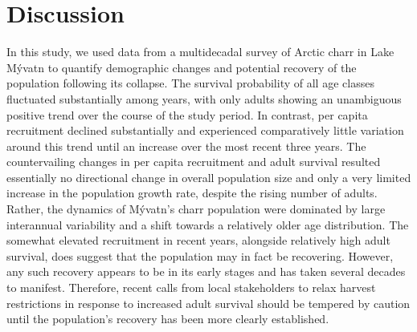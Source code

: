 \documentclass[11pt]{article}
\begin{document}
\section*{Discussion}

In this study, 
we used data from a multidecadal survey of Arctic charr in Lake M\'{y}vatn
to quantify demographic changes and potential recovery of the population
following its collapse.
The survival probability of all age classes fluctuated substantially among years,
with only adults showing an unambiguous positive trend over the course of the study period.
In contrast, per capita recruitment declined substantially and experienced comparatively little
variation around this trend until an increase over the most recent three years.
The countervailing changes in  per capita recruitment and adult survival resulted 
essentially no directional change in overall population size 
and only a very limited increase in the population growth rate,
despite the rising number of adults.
Rather, the dynamics of  M\'{y}vatn's charr population 
were dominated by large interannual variability
and a shift towards a relatively older age distribution.
The somewhat elevated recruitment in recent years, alongside relatively high adult survival,
does suggest that the population may in fact be recovering.
However, any such recovery appears to be in its early stages and 
has taken several decades to manifest.
Therefore, recent calls from local stakeholders to relax harvest restrictions 
in response to increased adult survival should be tempered by caution
until the population's recovery has been more clearly established.
\end{document}
